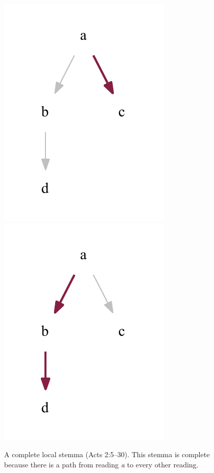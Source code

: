 \documentclass[a4paper, 12pt]{article}
\begin{document}
\begin{figure}[h!]
		\includegraphics[scale=0.6666]{../graphics/B05K2V5U26-30-local-stemma-path-2.pdf}
		\includegraphics[scale=0.6666]{../graphics/B05K2V5U26-30-local-stemma-path-3.pdf}
		\caption{A complete local stemma (Acts 2:5–30). This stemma is complete because there is a path from reading \emph{a} to every other reading.}
		\label{fig:local-stemma-complete}
	\end{figure}
	
	\newpage
	
\end{document}
